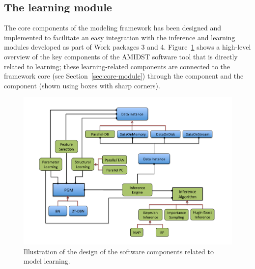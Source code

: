 



% 





 



\subsection{The learning module}

The core components of the modeling framework has been designed and implemented to facilitate an easy
integration with the inference and learning modules developed as part of Work packages 3 and 4. Figure~\ref{fig:design-learning} 
shows a high-level overview of the key components of the AMIDST software tool that is directly
related to learning; these learning-related components are connected to the framework core (see Section~\ref{sec:core-module}) through the 
component and the  component (shown using boxes with sharp corners).   

  \begin{figure}[htbp]
    \centering
    \includegraphics[width=1.05\linewidth]{design-learning2}
    \caption{Illustration of the design of the software components related to model learning. }
    \label{fig:design-learning}
  \end{figure}

